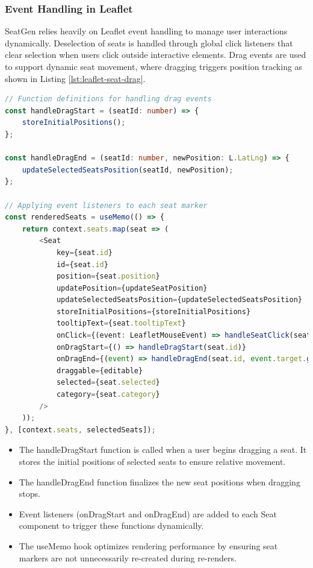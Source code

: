 \subsubsection{Event Handling in Leaflet}

SeatGen relies heavily on Leaflet event handling to manage user interactions dynamically. Deselection of seats is handled through global click listeners that clear selection when users click outside interactive elements. Drag events are used to support dynamic seat movement, where dragging triggers position tracking as shown in Listing \ref{lst:leaflet-seat-drag}.


\begin{lstlisting}[language=TypeScript, caption=Handling Seat Drag Events, label=lst:leaflet-seat-drag]
// Function definitions for handling drag events
const handleDragStart = (seatId: number) => {
    storeInitialPositions();
};

const handleDragEnd = (seatId: number, newPosition: L.LatLng) => {
    updateSelectedSeatsPosition(seatId, newPosition);
};

// Applying event listeners to each seat marker
const renderedSeats = useMemo(() => {
    return context.seats.map(seat => (
        <Seat 
            key={seat.id} 
            id={seat.id}
            position={seat.position} 
            updatePosition={updateSeatPosition}
            updateSelectedSeatsPosition={updateSelectedSeatsPosition}
            storeInitialPositions={storeInitialPositions} 
            tooltipText={seat.tooltipText}
            onClick={(event: LeafletMouseEvent) => handleSeatClick(seat.id, event)}
            onDragStart={() => handleDragStart(seat.id)}
            onDragEnd={(event) => handleDragEnd(seat.id, event.target.getLatLng())}
            draggable={editable}
            selected={seat.selected}
            category={seat.category}
        />
    ));
}, [context.seats, selectedSeats]);
\end{lstlisting}

\begin{itemize}
    \item The handleDragStart function is called when a user begins dragging a seat. It stores the initial positions of selected seats to ensure relative movement.
    \item The handleDragEnd function finalizes the new seat positions when dragging stops.
    \item Event listeners (onDragStart and onDragEnd) are added to each Seat component to trigger these functions dynamically.
    \item The useMemo hook optimizes rendering performance by ensuring seat markers are not unnecessarily re-created during re-renders.
\end{itemize}

